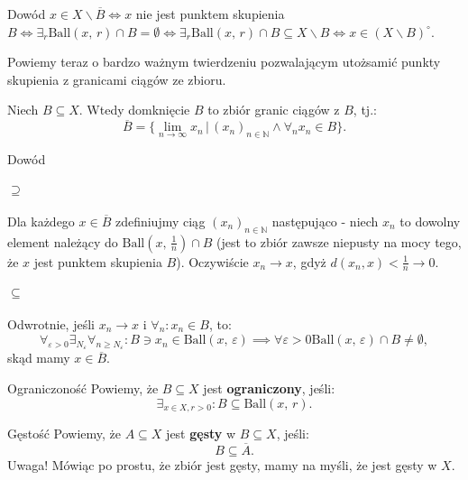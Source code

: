 \documentclass{article}
\newcounter{defi}
\numberwithin{defi}{section}
\numberwithin{theo}{section}
\numberwithin{defi}{section}
\newcommand{\N}{\mathbb{N}}
\newcommand{\oo}{\infty}
\newcommand{\eps}{\varepsilon}
\newcommand{\dg}{^{\circ}}
\newcommand{\ciag}[1]{(#1_{n})_{n \in \N}}
\newcommand{\ball}[2]{\text{Ball}(#1, \, #2)}
\begin{document}
\begin{dow}{Dowód}
    $x \in X \backslash \overline{B} \iff x$ nie jest punktem skupienia $B \iff \exists_r \ball{x}{r} \cap B = \emptyset \iff \exists_r \ball{x}{r} \cap B \subseteq X \backslash B \iff x \in (X \backslash B) \dg$.
\end{dow}


Powiemy teraz o bardzo ważnym twierdzeniu pozwalającym utożsamić punkty skupienia z granicami ciągów ze zbioru.
\begin{twier}{}
    Niech $B \subseteq X$. Wtedy domknięcie $B$ to zbiór granic ciągów z $B$, tj.: \begin{equation}
        \overline{B} = \{ \lim_{n\to \oo} x_n \,  \big| \, \ciag{x} \wedge \forall_n x_n \in B \}.
    \end{equation}
\end{twier}

\begin{dow}{Dowód}
    \paragraph{$\supseteq$} Dla każdego $x \in \overline{B}$ zdefiniujmy ciąg $\ciag{x}$ następująco - niech $x_n$ to dowolny element należący do $\ball{x}{\frac{1}{n}} \cap B$ (jest to zbiór zawsze niepusty na mocy tego, że $x$ jest punktem skupienia $B$). Oczywiście $ x_n \to x$, gdyż $d(x_n, x) < \frac{1}{n} \to 0$.
    \paragraph{$\subseteq$} Odwrotnie, jeśli $x_n \to x$ i $\forall_n : x_n \in B$, to: \begin{equation}
        \forall_{\eps > 0} \exists_{N_\eps} \forall_{n \geqslant N_\eps}: B \ni x_n \in \ball{x}{\eps} \implies \forall{\eps >0} \ball{x}{\eps} \cap B \neq \emptyset,
    \end{equation} skąd mamy $x \in \overline{B}$.
\end{dow}

\begin{defr}{Ograniczoność}
    Powiemy, że $B \subseteq X$ jest \textbf{ograniczony}, jeśli: \begin{equation}
        \exists_{x \in X, r >0}: B \subseteq \ball{x}{r}.
    \end{equation}
\end{defr}

\begin{defr}{Gęstość}
    Powiemy, że $A \subseteq X$ jest \textbf{gęsty} w $B \subseteq X$, jeśli: \begin{equation}
        B \subseteq \overline{A}.
    \end{equation}
    Uwaga! Mówiąc po prostu, że zbiór jest gęsty, mamy na myśli, że jest gęsty w $X$.
\end{defr}
\end{document}
